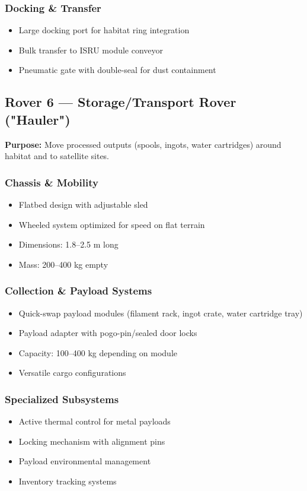 \documentclass[12pt, a4paper]{article}
\begin{document}
\subsubsection{Docking \& Transfer}
\begin{itemize}
    \item Large docking port for habitat ring integration
    \item Bulk transfer to ISRU module conveyor
    \item Pneumatic gate with double-seal for dust containment
\end{itemize}

\subsection{Rover 6 — Storage/Transport Rover ("Hauler")}

\textbf{Purpose:} Move processed outputs (spools, ingots, water cartridges) around habitat and to satellite sites.

\subsubsection{Chassis \& Mobility}
\begin{itemize}
    \item Flatbed design with adjustable sled
    \item Wheeled system optimized for speed on flat terrain
    \item Dimensions: 1.8–2.5 m long
    \item Mass: 200–400 kg empty
\end{itemize}

\subsubsection{Collection \& Payload Systems}
\begin{itemize}
    \item Quick-swap payload modules (filament rack, ingot crate, water cartridge tray)
    \item Payload adapter with pogo-pin/sealed door locks
    \item Capacity: 100–400 kg depending on module
    \item Versatile cargo configurations
\end{itemize}

\subsubsection{Specialized Subsystems}
\begin{itemize}
    \item Active thermal control for metal payloads
    \item Locking mechanism with alignment pins
    \item Payload environmental management
    \item Inventory tracking systems
\end{itemize}
\end{document}
